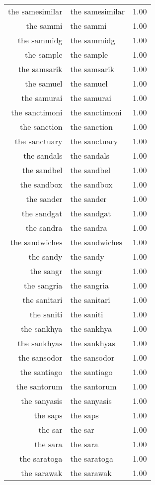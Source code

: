 \begin{table}[ht]
\begin{tabular}{rlr}
  the samesimilar & the samesimilar & 1.00 \\ 
  the sammi & the sammi & 1.00 \\ 
  the sammidg & the sammidg & 1.00 \\ 
  the sample & the sample & 1.00 \\ 
  the samsarik & the samsarik & 1.00 \\ 
  the samuel & the samuel & 1.00 \\ 
  the samurai & the samurai & 1.00 \\ 
  the sanctimoni & the sanctimoni & 1.00 \\ 
  the sanction & the sanction & 1.00 \\ 
  the sanctuary & the sanctuary & 1.00 \\ 
  the sandals & the sandals & 1.00 \\ 
  the sandbel & the sandbel & 1.00 \\ 
  the sandbox & the sandbox & 1.00 \\ 
  the sander & the sander & 1.00 \\ 
  the sandgat & the sandgat & 1.00 \\ 
  the sandra & the sandra & 1.00 \\ 
  the sandwiches & the sandwiches & 1.00 \\ 
  the sandy & the sandy & 1.00 \\ 
  the sangr & the sangr & 1.00 \\ 
  the sangria & the sangria & 1.00 \\ 
  the sanitari & the sanitari & 1.00 \\ 
  the saniti & the saniti & 1.00 \\ 
  the sankhya & the sankhya & 1.00 \\ 
  the sankhyas & the sankhyas & 1.00 \\ 
  the sansodor & the sansodor & 1.00 \\ 
  the santiago & the santiago & 1.00 \\ 
  the santorum & the santorum & 1.00 \\ 
  the sanyasis & the sanyasis & 1.00 \\ 
  the saps & the saps & 1.00 \\ 
  the sar & the sar & 1.00 \\ 
  the sara & the sara & 1.00 \\ 
  the saratoga & the saratoga & 1.00 \\ 
  the sarawak & the sarawak & 1.00 \\ 

\end{tabular}
\end{table}
